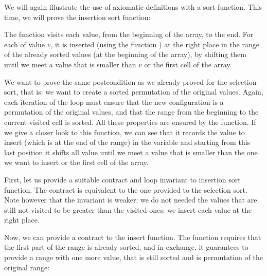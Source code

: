 


We will again illustrate the use of axiomatic definitions with a sort
function. This time, we will prove the insertion sort function:





The  function visits each value, from the beginning
of the array, to the end. For each of value $v$, it is inserted (using the
function ) at the right place in the range of the already
sorted values (at the beginning of the array), by shifting them until we meet a
value that is smaller than $v$ or the first cell of the array.




We want to prove the same postcondition as we already proved for the selection
sort, that is: we want to create a sorted permutation of the original values.
Again, each iteration of the loop must ensure that the new configuration is a
permutation of the original values, and that the range from the beginning to
the current visited cell is sorted. All these properties are ensured by the
 function. If we give a closer look to this function, we can
see that it records the value to insert (which is at the end of the range) in
the variable  and starting from this last position it shifts
all value until we meet a value that is smaller than the one we want to insert
or the first cell of the array.




First, let us provide a suitable contract and loop invariant to insertion sort
function. The contract is equivalent to the one provided to the selection sort.
Note however that the invariant is weaker: we do not needed the values that are
still not visited to be greater than the visited ones: we insert each value at
the right place.






Now, we can provide a contract to the insert function. The function requires
that the first part of the range is already sorted, and in exchange, it
guarantees to provide a range with one more value, that is still sorted and
is permutation of the original range:




